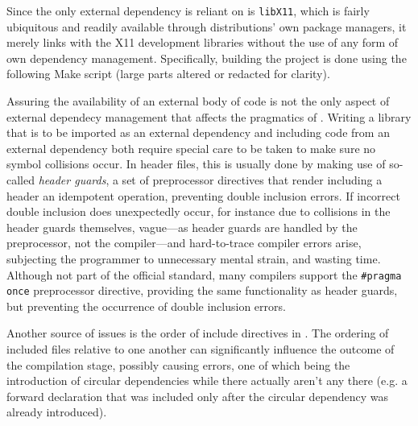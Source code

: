 Since  the only  external dependency  \wmcpp is  reliant on  is \texttt{libX11},
which  is fairly  ubiquitous and  readily available  through distributions'  own
package managers, it merely links with the X11 development libraries without the
use of any form of own dependency management. Specifically, building the project
is  done  using the  following  \textup{Make}  script  (large parts  altered  or
redacted for clarity).


Assuring the availability of an external body  of code is not the only aspect of
external dependecy  management that  affects the pragmatics  of \cpp.  Writing a
library that is to be imported as an external dependency and including code from
an external  dependency both require  special care to be  taken to make  sure no
symbol collisions occur. In header files, this  is usually done by making use of
so-called \textit{header guards},  a set of preprocessor  directives that render
including a header an idempotent  operation, preventing double inclusion errors.
If  incorrect double  inclusion does  unexpectedly  occur, for  instance due  to
collisions in the header guards themselves, vague---as header guards are handled
by the preprocessor, not the compiler---and hard-to-trace compiler errors arise,
subjecting  the  programmer to  unnecessary  mental  strain, and  wasting  time.
Although not  part of  the official  standard\cite{cppstd}, many  \cpp compilers
support the \texttt{#pragma once} preprocessor directive, providing the
same functionality  as header  guards, but preventing  the occurrence  of double
inclusion errors.

Another  source of  issues  is the  order  of include  directives  in \cpp.  The
ordering of included  files relative to one another  can significantly influence
the outcome  of the  compilation stage,  possibly causing  errors, one  of which
being the introduction of circular  dependencies while there actually aren't any
there (e.g.  a forward  declaration that  was included  only after  the circular
dependency was already introduced).\\


